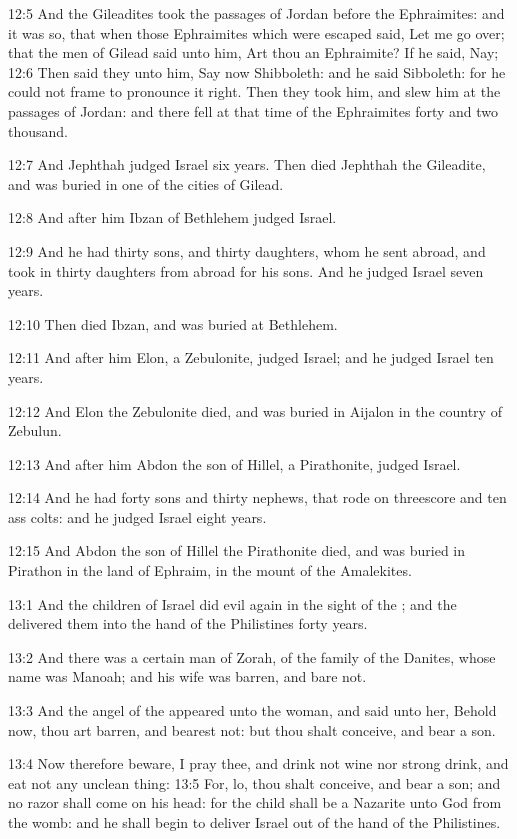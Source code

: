 12:5 And the Gileadites took the passages of Jordan before the
Ephraimites: and it was so, that when those Ephraimites which were
escaped said, Let me go over; that the men of Gilead said unto him,
Art thou an Ephraimite? If he said, Nay; 12:6 Then said they unto him,
Say now Shibboleth: and he said Sibboleth: for he could not frame to
pronounce it right. Then they took him, and slew him at the passages
of Jordan: and there fell at that time of the Ephraimites forty and
two thousand.

12:7 And Jephthah judged Israel six years. Then died Jephthah the
Gileadite, and was buried in one of the cities of Gilead.

12:8 And after him Ibzan of Bethlehem judged Israel.

12:9 And he had thirty sons, and thirty daughters, whom he sent
abroad, and took in thirty daughters from abroad for his sons. And he
judged Israel seven years.

12:10 Then died Ibzan, and was buried at Bethlehem.

12:11 And after him Elon, a Zebulonite, judged Israel; and he judged
Israel ten years.

12:12 And Elon the Zebulonite died, and was buried in Aijalon in the
country of Zebulun.

12:13 And after him Abdon the son of Hillel, a Pirathonite, judged
Israel.

12:14 And he had forty sons and thirty nephews, that rode on
threescore and ten ass colts: and he judged Israel eight years.

12:15 And Abdon the son of Hillel the Pirathonite died, and was buried
in Pirathon in the land of Ephraim, in the mount of the Amalekites.

13:1 And the children of Israel did evil again in the sight of the
\LORD; and the \LORD delivered them into the hand of the Philistines
forty years.

13:2 And there was a certain man of Zorah, of the family of the
Danites, whose name was Manoah; and his wife was barren, and bare not.

13:3 And the angel of the \LORD appeared unto the woman, and said unto
her, Behold now, thou art barren, and bearest not: but thou shalt
conceive, and bear a son.

13:4 Now therefore beware, I pray thee, and drink not wine nor strong
drink, and eat not any unclean thing: 13:5 For, lo, thou shalt
conceive, and bear a son; and no razor shall come on his head: for the
child shall be a Nazarite unto God from the womb: and he shall begin
to deliver Israel out of the hand of the Philistines.

